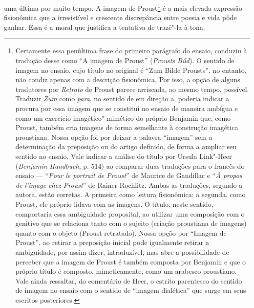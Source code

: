 uma última por muito tempo. A imagem de Proust\footnote{Certamente
  essa penúltima frase do primeiro parágrafo do ensaio, conduziu à
  tradução desse como ``A imagem de Proust'' (\emph{Prousts Bild}). O
  sentido de imagem no ensaio, cujo título no original é ``Zum Bilde
  Prousts'', no entanto, não condiz apenas com a descrição fisionômica.
  Por isso, a opção de alguns tradutores por \emph{Retrato} de Proust
  parece arriscada, ao mesmo tempo, possível. Traduzir \emph{Zum} como
  \emph{para}, no sentido de em direção a, poderia indicar a procura por
  essa imagem que se constitui no ensaio de maneira ambígua e como um
  exercício imagético"-mimético do próprio Benjamin que, como Proust,
  também cria imagens de forma semelhante à construção imagética
  proustiana. Nossa opção foi por deixar a palavra ``imagem'' sem a
  determinação da preposição ou do artigo definido, de forma a ampliar
  seu sentido no ensaio. Vale indicar a análise do título por Ursula
  Link"-Heer (\emph{Benjamin Handbuch}, p. 514) ao comparar duas traduções
  para o francês do ensaio --- ``\emph{Pour le portrait de Proust}'' de
  Maurice de Gandillac e ``\emph{À propos de l'image chez Proust}'' de
  Rainer Rochlitz. Ambas as traduções, segundo a autora, estão corretas.
  A primeira como leitura fisionômica; a segunda, como Proust, ele
  próprio lidava com as imagens. O título, neste sentido, comportaria
  essa ambiguidade proposital, ao utilizar uma composição com o genitivo
  que se relaciona tanto com o sujeito (criação proustiana de imagens)
  quanto com o objeto (Proust retratado). Nossa opção por ``Imagem de
  Proust'', ao retirar a preposição inicial pode igualmente retirar a
  ambiguidade, por assim dizer, intraduzível, mas abre a possibilidade
  de perceber que a imagem de Proust é também composta por Benjamin e
  que o próprio título é composto, mimeticamente, como um arabesco
  proustiano. Vale ainda ressaltar, do comentário de Heer, o estrito
  parentesco do sentido de imagem no ensaio com o sentido de ``imagem
  dialética'' que surge em seus escritos posteriores. \versal{[N.~T.]}} é a mais elevada
expressão fisionômica que a irresistível e crescente discrepância entre
poesia e vida pôde ganhar. Essa é a moral que justifica a tentativa de
trazê"-la à tona.

